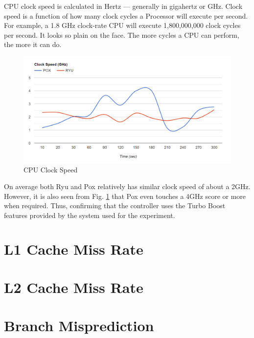 CPU clock speed is calculated in Hertz — generally in gigahertz or GHz. Clock speed is a function of how many
clock cycles a Processor will execute per second. For example, a 1.8 GHz clock-rate CPU will execute 1,800,000,000 clock cycles per second. It looks so plain on the face. The more cycles a CPU can perform, the more it can do.

\begin{figure}[!hbt]
    \centering
        \includegraphics[width=\textwidth,keepaspectratio]{images/clock_speed.png}
       \caption{CPU Clock Speed}
        \label{clockspeed}
\end{figure}

On average both Ryu and Pox relatively has similar clock speed of about a 2GHz. However, it is also seen from Fig. \ref{clockspeed} that Pox even touches a 4GHz score or more when required. Thus, confirming that the controller uses the Turbo Boost features provided by the system used for the experiment.

\section{L1 Cache Miss Rate}



\section{L2 Cache Miss Rate}

\section{Branch Misprediction}